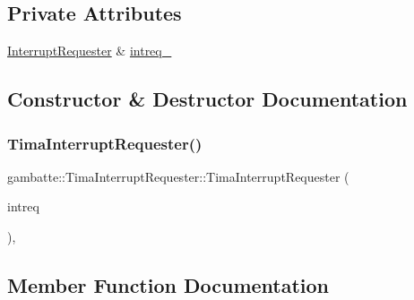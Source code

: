 \subsection*{Private Attributes}
\begin{DoxyCompactItemize}
\item 
\hyperlink{classgambatte_1_1InterruptRequester}{Interrupt\+Requester} \& \hyperlink{classgambatte_1_1TimaInterruptRequester_a56e706d1df000a87c2a1831d5b5e6400}{intreq\+\_\+}
\end{DoxyCompactItemize}


\subsection{Constructor \& Destructor Documentation}
\mbox{\label{classgambatte_1_1TimaInterruptRequester_a3e26489e088447e04d49bf0838b90feb}} 
\subsubsection{\texorpdfstring{Tima\+Interrupt\+Requester()}{TimaInterruptRequester()}}
{\footnotesize\ttfamily gambatte\+::\+Tima\+Interrupt\+Requester\+::\+Tima\+Interrupt\+Requester (\begin{DoxyParamCaption}\item[{\hyperlink{classgambatte_1_1InterruptRequester}{Interrupt\+Requester} \&}]{intreq }\end{DoxyParamCaption})\hspace{0.3cm}{\ttfamily [inline]}, {\ttfamily [explicit]}}



\subsection{Member Function Documentation}
\mbox{\label{classgambatte_1_1TimaInterruptRequester_aeee10b6564330e027830d10cabf41ffe}} 

